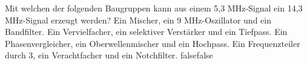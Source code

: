     {Mit welchen der folgenden Baugruppen kann aus einem 5,3 MHz-Signal ein 14,3 MHz-Signal erzeugt werden?}
    {Ein Mischer, ein 9 MHz-Oszillator und ein Bandfilter.}
    {Ein Vervielfacher, ein selektiver Verstärker und ein Tiefpass.}
    {Ein Phasenvergleicher, ein Oberwellenmischer und ein Hochpass.}
    {Ein Frequenzteiler durch 3, ein Verachtfacher und ein Notchfilter.}
    {false}{false}